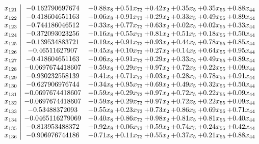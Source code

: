 \documentclass[8pt]{article}
\begin{document}
\[\begin{array}{c| c c@{\hskip 2pt} c@{\hskip 2pt} c@{\hskip 2pt} c@{\hskip 2pt} c@{\hskip 2pt} c@{\hskip 2pt} }
 x_{121}   &  -0.162790697674 & +  0.88 x_{8} & +  0.51 x_{73} & +  0.42 x_{2} & +  0.35 x_{5} & +  0.35 x_{55} & +  0.88 x_{44}\\
 x_{122}   &  -0.418604651163 & +  0.06 x_{8} & +  0.91 x_{73} & +  0.29 x_{2} & +  0.33 x_{5} & +  0.49 x_{55} & +  0.89 x_{44}\\
 x_{123}   &  -0.744186046512 & +  0.33 x_{8} & +  0.77 x_{73} & +  0.63 x_{2} & +  0.02 x_{5} & +  0.02 x_{55} & +  0.33 x_{44}\\
 x_{124}   &  -0.372093023256 & +  0.16 x_{8} & +  0.55 x_{73} & +  0.81 x_{2} & +  0.51 x_{5} & +  0.18 x_{55} & +  0.50 x_{44}\\
 x_{125}   &  -0.139534883721 & +  0.19 x_{8} & +  0.91 x_{73} & +  0.93 x_{2} & +  0.44 x_{5} & +  0.78 x_{55} & +  0.85 x_{44}\\
 x_{126}   &  -0.46511627907 & +  0.45 x_{8} & +  0.10 x_{73} & +  0.27 x_{2} & +  0.14 x_{5} & +  0.64 x_{55} & +  0.95 x_{44}\\
 x_{127}   &  -0.418604651163 & +  0.06 x_{8} & +  0.91 x_{73} & +  0.29 x_{2} & +  0.33 x_{5} & +  0.49 x_{55} & +  0.89 x_{44}\\
 x_{128}   &  -0.0697674418607 & +  0.59 x_{8} & +  0.29 x_{73} & +  0.97 x_{2} & +  0.72 x_{5} & +  0.22 x_{55} & +  0.09 x_{44}\\
 x_{129}   &  -0.930232558139 & +  0.41 x_{8} & +  0.71 x_{73} & +  0.03 x_{2} & +  0.28 x_{5} & +  0.78 x_{55} & +  0.91 x_{44}\\
 x_{130}   &  -0.627906976744 & +  0.34 x_{8} & +  0.95 x_{73} & +  0.69 x_{2} & +  0.49 x_{5} & +  0.32 x_{55} & +  0.50 x_{44}\\
 x_{131}   &  -0.0697674418607 & +  0.59 x_{8} & +  0.29 x_{73} & +  0.97 x_{2} & +  0.72 x_{5} & +  0.22 x_{55} & +  0.09 x_{44}\\
 x_{132}   &  -0.0697674418607 & +  0.59 x_{8} & +  0.29 x_{73} & +  0.97 x_{2} & +  0.72 x_{5} & +  0.22 x_{55} & +  0.09 x_{44}\\
 x_{133}   &  -0.53488372093 & +  0.55 x_{8} & +  0.23 x_{73} & +  0.73 x_{2} & +  0.86 x_{5} & +  0.69 x_{55} & +  0.71 x_{44}\\
 x_{134}   &  -0.0465116279069 & +  0.40 x_{8} & +  0.86 x_{73} & +  0.98 x_{2} & +  0.81 x_{5} & +  0.81 x_{55} & +  0.40 x_{44}\\
 x_{135}   &  -0.813953488372 & +  0.92 x_{8} & +  0.06 x_{73} & +  0.59 x_{2} & +  0.74 x_{5} & +  0.24 x_{55} & +  0.42 x_{44}\\
 x_{136}   &  -0.906976744186 & +  0.71 x_{8} & +  0.11 x_{73} & +  0.55 x_{2} & +  0.37 x_{5} & +  0.21 x_{55} & +  0.88 x_{44}\\

\end{array}\]
\end{document}
